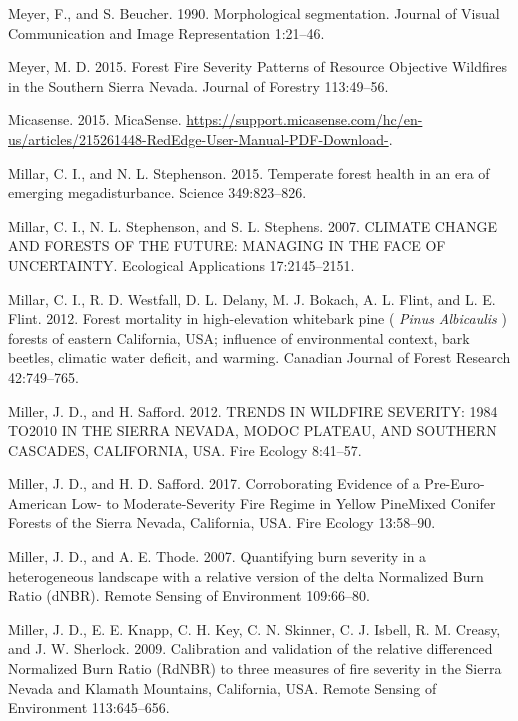 \documentclass[twoside,12pt,final]{ucthesis-CA2012}
\begin{document}
\begin{ucmainmatter}
\hypertarget{ref-meyer1990}{}
Meyer, F., and S. Beucher. 1990. Morphological segmentation. Journal of
Visual Communication and Image Representation 1:21--46.

\hypertarget{ref-meyer2015}{}
Meyer, M. D. 2015. Forest Fire Severity Patterns of Resource Objective
Wildfires in the Southern Sierra Nevada. Journal of Forestry 113:49--56.

\hypertarget{ref-micasense2015}{}
Micasense. 2015. MicaSense.
\url{https://support.micasense.com/hc/en-us/articles/215261448-RedEdge-User-Manual-PDF-Download-}.

\hypertarget{ref-millar2015}{}
Millar, C. I., and N. L. Stephenson. 2015. Temperate forest health in an
era of emerging megadisturbance. Science 349:823--826.

\hypertarget{ref-millar2007}{}
Millar, C. I., N. L. Stephenson, and S. L. Stephens. 2007. CLIMATE
CHANGE AND FORESTS OF THE FUTURE: MANAGING IN THE FACE OF UNCERTAINTY.
Ecological Applications 17:2145--2151.

\hypertarget{ref-millar2012}{}
Millar, C. I., R. D. Westfall, D. L. Delany, M. J. Bokach, A. L. Flint,
and L. E. Flint. 2012. Forest mortality in high-elevation whitebark pine
( \emph{Pinus} \emph{Albicaulis} ) forests of eastern California, USA;
influence of environmental context, bark beetles, climatic water
deficit, and warming. Canadian Journal of Forest Research 42:749--765.

\hypertarget{ref-miller2012a}{}
Miller, J. D., and H. Safford. 2012. TRENDS IN WILDFIRE SEVERITY: 1984
TO2010 IN THE SIERRA NEVADA, MODOC PLATEAU, AND SOUTHERN CASCADES,
CALIFORNIA, USA. Fire Ecology 8:41--57.

\hypertarget{ref-miller2017}{}
Miller, J. D., and H. D. Safford. 2017. Corroborating Evidence of a
Pre-Euro-American Low- to Moderate-Severity Fire Regime in Yellow
PineMixed Conifer Forests of the Sierra Nevada, California, USA. Fire
Ecology 13:58--90.

\hypertarget{ref-miller2007}{}
Miller, J. D., and A. E. Thode. 2007. Quantifying burn severity in a
heterogeneous landscape with a relative version of the delta Normalized
Burn Ratio (dNBR). Remote Sensing of Environment 109:66--80.

\hypertarget{ref-miller2009a}{}
Miller, J. D., E. E. Knapp, C. H. Key, C. N. Skinner, C. J. Isbell, R.
M. Creasy, and J. W. Sherlock. 2009. Calibration and validation of the
relative differenced Normalized Burn Ratio (RdNBR) to three measures of
fire severity in the Sierra Nevada and Klamath Mountains, California,
USA. Remote Sensing of Environment 113:645--656.


\end{ucmainmatter}
\end{document}
